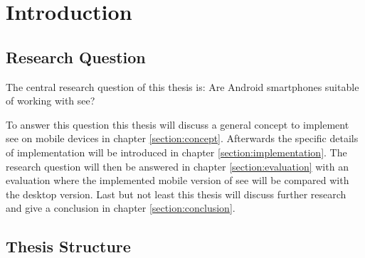 \section{Introduction}

\subsection{Research Question}
\label{research}
The central research question of this thesis is: Are Android smartphones suitable of working with \gls{see}?

To answer this question this thesis will discuss a general concept to implement \gls{see} on mobile devices in chapter \ref{section:concept}.
Afterwards the specific details of implementation will be introduced in chapter \ref{section:implementation}. 
The research question will then be answered in chapter \ref{section:evaluation} with an evaluation where the implemented mobile version of \gls{see} will be compared with the desktop version.
Last but not least this thesis will discuss further research and give a conclusion in chapter \ref{section:conclusion}.

\subsection{Thesis Structure}